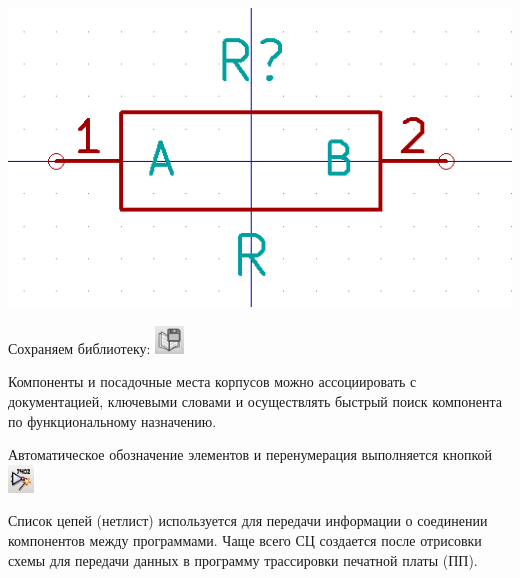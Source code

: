 



\bigskip
\includegraphics[height=0.5\textheight]{kicad/lib29.png}
\bigskip

Сохраняем библиотеку: \includegraphics[height=2em]{kicad/lib30.png}






Компоненты и посадочные места корпусов можно ассоциировать с документацией,
ключевыми словами и осуществлять быстрый поиск компонента по функциональному
назначению.

\secup


\secdown


Автоматическое обозначение элементов и перенумерация выполняется кнопкой\\
\includegraphics[height=2em]{kicad/ee000004.png}


Список цепей (нетлист) используется для передачи информации о соединении
компонентов между программами. Чаще всего СЦ создается после отрисовки схемы для
передачи данных в программу трассировки печатной платы (ПП).

\secup

